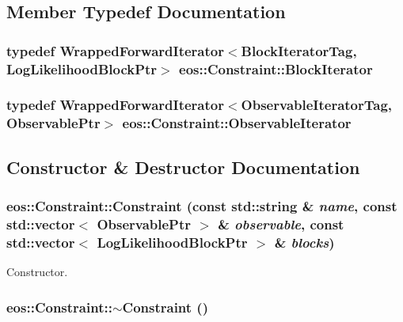 \subsection{Member Typedef Documentation}
\hypertarget{classeos_1_1Constraint_a44726a3e0954f645183b9e28d911345a}{
\subsubsection[{BlockIterator}]{\setlength{\rightskip}{0pt plus 5cm}typedef {\bf WrappedForwardIterator}$<$BlockIteratorTag, {\bf LogLikelihoodBlockPtr}$>$ {\bf eos::Constraint::BlockIterator}}}
\label{classeos_1_1Constraint_a44726a3e0954f645183b9e28d911345a}
\hypertarget{classeos_1_1Constraint_a44010ea20596a593325202033743f357}{
\subsubsection[{ObservableIterator}]{\setlength{\rightskip}{0pt plus 5cm}typedef {\bf WrappedForwardIterator}$<$ObservableIteratorTag, {\bf ObservablePtr}$>$ {\bf eos::Constraint::ObservableIterator}}}
\label{classeos_1_1Constraint_a44010ea20596a593325202033743f357}


\subsection{Constructor \& Destructor Documentation}
\hypertarget{classeos_1_1Constraint_a2be956c51e9f34e2ed816ed65be76f1e}{
\subsubsection[{Constraint}]{\setlength{\rightskip}{0pt plus 5cm}eos::Constraint::Constraint (const std::string \& {\em name}, \/  const std::vector$<$ {\bf ObservablePtr} $>$ \& {\em observable}, \/  const std::vector$<$ {\bf LogLikelihoodBlockPtr} $>$ \& {\em blocks})}}
\label{classeos_1_1Constraint_a2be956c51e9f34e2ed816ed65be76f1e}


Constructor. \hypertarget{classeos_1_1Constraint_a9ec79cb58f7a54c65681cd0f05dcb672}{
\subsubsection[{$\sim$Constraint}]{\setlength{\rightskip}{0pt plus 5cm}eos::Constraint::$\sim$Constraint ()}}
\label{classeos_1_1Constraint_a9ec79cb58f7a54c65681cd0f05dcb672}


